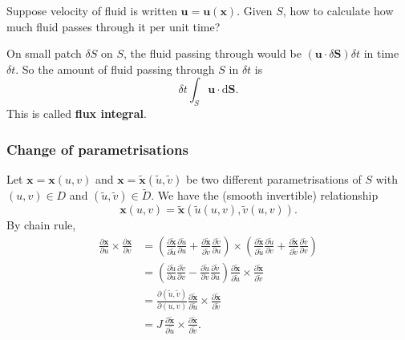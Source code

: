 \begin{example}
    Suppose velocity of fluid is written $ \mathbf{u}=\mathbf{u}(\mathbf{x}) $. Given $S$, how to calculate how much fluid passes through it per unit time?

    On small patch $ \delta S $ on $S$, the fluid passing through would be $ (\mathbf{u} \cdot \delta\mathbf{S})\delta t$ in time $ \delta t $. So the amount of fluid passing through $S$ in $ \delta t $ is 
    \[
        \delta t \int_{S} \mathbf{u} \cdot \mathrm{d}\mathbf{S}.
    \]
    This is called \textbf{flux integral}.
\end{example}

\subsubsection*{Change of parametrisations}
Let $ \mathbf{x}=\mathbf{x}(u,v) $ and $ \mathbf{x} = \tilde{\mathbf{x}}(\tilde{u},\tilde{v}) $ be two different parametrisations of $S$ with $ (u,v)\in D $ and $ (\tilde{u},\tilde{v})\in \tilde{D} $. We have the (smooth invertible) relationship 
\[
    \mathbf{x}(u,v) = \tilde{\mathbf{x}}(\tilde{u}(u,v),\tilde{v}(u,v)).
\]
By chain rule,
\begin{align*}
    \frac{\partial \mathbf{x}}{\partial u}\times \frac{\partial \mathbf{x}}{\partial v} &= \left( \frac{\partial \tilde{\mathbf{x}}}{\partial \tilde{u}}\frac{\partial \tilde{u}}{\partial u}+ \frac{\partial \tilde{\mathbf{x}}}{\partial \tilde{v}}\frac{\partial \tilde{v}}{\partial u}  \right) \times \left( \frac{\partial \tilde{\mathbf{x}}}{\partial \tilde{u}}\frac{\partial \tilde{u}}{\partial v}+\frac{\partial \tilde{\mathbf{x}}}{\partial \tilde{v}}\frac{\partial \tilde{v}}{\partial v} \right)\\ 
    &= \left( \frac{\partial \tilde{u}}{\partial u}\frac{\partial \tilde{v}}{\partial v}-\frac{\partial \tilde{u}}{\partial v}\frac{\partial \tilde{v}}{\partial u} \right)\frac{\partial \tilde{\mathbf{x}}}{\partial \tilde{u}}\times \frac{\partial \tilde{\mathbf{x}}}{\partial \tilde{v}}\\ 
    &=\frac{\partial (\tilde{u},\tilde{v})}{\partial (u,v)} \frac{\partial \tilde{\mathbf{x}}}{\partial \tilde{u}}\times \frac{\partial \tilde{\mathbf{x}}}{\partial \tilde{v}}\\ 
    &= J\,\frac{\partial \tilde{\mathbf{x}}}{\partial \tilde{u}}\times \frac{\partial \tilde{\mathbf{x}}}{\partial \tilde{v}}.
\end{align*}

